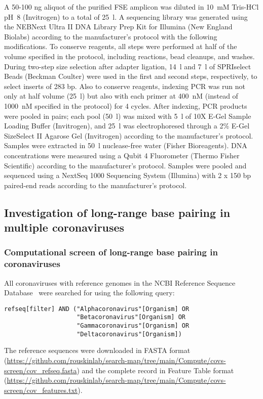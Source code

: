 \documentclass[main.tex]{subfiles}
\begin{document}
A 50-100 ng aliquot of the purified FSE amplicon was diluted in 10~mM Tris-HCl pH~8 (Invitrogen) to a total of 25~\textmu l.
A sequencing library was generated using the NEBNext Ultra II DNA Library Prep Kit for Illumina (New England Biolabs) according to the manufacturer's protocol with the following modifications.
To conserve reagents, all steps were performed at half of the volume specified in the protocol, including reactions, bead cleanups, and washes.
During two-step size selection after adapter ligation, 14~\textmu l and 7~\textmu l of SPRIselect Beads (Beckman Coulter) were used in the first and second steps, respectively, to select inserts of 283 bp.
Also to conserve reagents, indexing PCR was run not only at half volume (25~\textmu l) but also with each primer at 400~nM (instead of 1000~nM specified in the protocol) for 4 cycles.
After indexing, PCR products were pooled in pairs; each pool (50~\textmu l) was mixed with 5~\textmu l of 10X E-Gel Sample Loading Buffer (Invitrogen), and 25~\textmu l was electrophoresed through a 2\% E-Gel SizeSelect II Agarose Gel (Invitrogen) according to the manufacturer's protocol.
Samples were extracted in 50~\textmu l nuclease-free water (Fisher Bioreagents).
DNA concentrations were measured using a Qubit 4 Fluorometer (Thermo Fisher Scientific) according to the manufacturer's protocol.
Samples were pooled and sequenced using a NextSeq 1000 Sequencing System (Illumina) with 2 x 150 bp paired-end reads according to the manufacturer's protocol.


\subsection{Investigation of long-range base pairing in multiple coronaviruses}

\subsubsection{Computational screen of long-range base pairing in coronaviruses}
\label{screen_lri_comp}

All coronaviruses with reference genomes in the NCBI Reference Sequence Database~\cite{OLeary2016} were searched for using the following query:
\begin{verbatim}
refseq[filter] AND ("Alphacoronavirus"[Organism] OR
                    "Betacoronavirus"[Organism] OR
                    "Gammacoronavirus"[Organism] OR
                    "Deltacoronavirus"[Organism])
\end{verbatim}
The reference sequences were downloaded in FASTA format (\url{https://github.com/rouskinlab/search-map/tree/main/Compute/covs-screen/cov_refseq.fasta}) and the complete record in Feature Table format (\url{https://github.com/rouskinlab/search-map/tree/main/Compute/covs-screen/cov_features.txt}).
\end{document}
